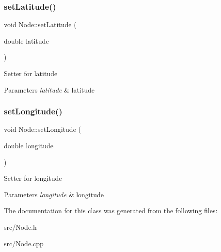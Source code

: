 \subsubsection{\texorpdfstring{set\+Latitude()}{setLatitude()}}
{\footnotesize\ttfamily void Node\+::set\+Latitude (\begin{DoxyParamCaption}\item[{double}]{latitude }\end{DoxyParamCaption})}

Setter for latitude 
\begin{DoxyParams}{Parameters}
{\em latitude} & latitude \\
\hline
\end{DoxyParams}
\mbox{\label{class_node_a1c64b31b2afe1d39a10809da9198a016}} 
\subsubsection{\texorpdfstring{set\+Longitude()}{setLongitude()}}
{\footnotesize\ttfamily void Node\+::set\+Longitude (\begin{DoxyParamCaption}\item[{double}]{longitude }\end{DoxyParamCaption})}

Setter for longitude 
\begin{DoxyParams}{Parameters}
{\em longitude} & longitude \\
\hline
\end{DoxyParams}


The documentation for this class was generated from the following files\+:\begin{DoxyCompactItemize}
\item 
src/Node.\+h\item 
src/Node.\+cpp\end{DoxyCompactItemize}
